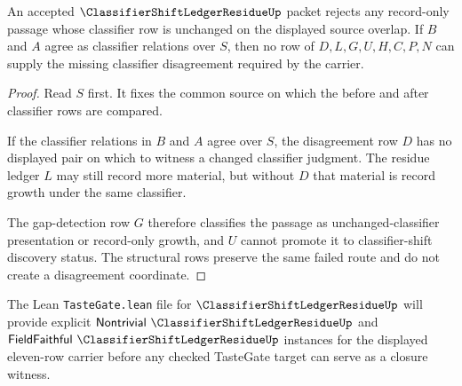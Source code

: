 \begin{theorem}
\label{thm:classifier-shift-ledger-residue-gap-detection}
An accepted $\ClassifierShiftLedgerResidueUp$ packet rejects any record-only passage whose classifier row is unchanged on the displayed source overlap. If $B$ and $A$ agree as classifier relations over $S$, then no row of $D,L,G,U,H,C,P,N$ can supply the missing classifier disagreement required by the carrier.
\end{theorem}
\begin{proof}
Read $S$ first. It fixes the common source on which the before and after classifier rows are compared.

If the classifier relations in $B$ and $A$ agree over $S$, the disagreement row $D$ has no displayed pair on which to witness a changed classifier judgment. The residue ledger $L$ may still record more material, but without $D$ that material is record growth under the same classifier.

The gap-detection row $G$ therefore classifies the passage as unchanged-classifier presentation or record-only growth, and $U$ cannot promote it to classifier-shift discovery status. The structural rows preserve the same failed route and do not create a disagreement coordinate.
\end{proof}



The Lean \texttt{TasteGate.lean} file for $\ClassifierShiftLedgerResidueUp$ will provide explicit $\mathsf{Nontrivial}\ \ClassifierShiftLedgerResidueUp$ and $\mathsf{FieldFaithful}\ \ClassifierShiftLedgerResidueUp$ instances for the displayed eleven-row carrier before any checked TasteGate target can serve as a closure witness.



